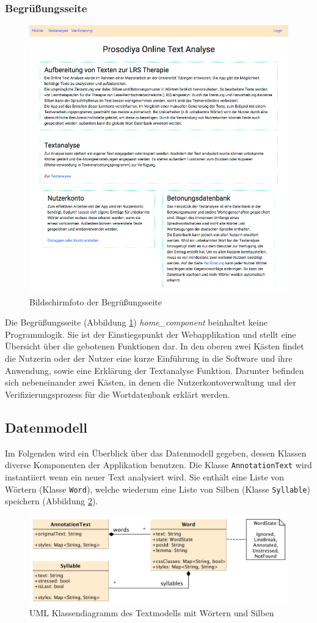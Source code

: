 \subsubsection{Begrüßungsseite}

\begin{figure}[h!]
	\centering
	\includegraphics[width=.6\linewidth, frame]{figures/frontend/home}
	\caption{Bildschirmfoto der Begrüßungsseite}
	\label{fig:frontend-home}
\end{figure}

Die Begrüßungsseite (Abbildung \ref{fig:frontend-home}) \textit{home\_component} beinhaltet keine Programmlogik. Sie ist der Einstiegspunkt der Webapplikation und stellt eine Übersicht über die gebotenen Funktionen dar. In den oberen zwei Kästen findet die Nutzerin oder der Nutzer eine kurze Einführung in die Software und ihre Anwendung, sowie eine Erklärung der Textanalyse Funktion. Darunter befinden sich nebeneinander zwei Kästen, in denen die Nutzerkontoverwaltung und der Verifizierungsprozess für die Wortdatenbank erklärt werden.

\subsection{Datenmodell}

Im Folgenden wird ein Überblick über das Datenmodell gegeben, dessen Klassen diverse Komponenten der Applikation benutzen. Die Klasse \texttt{AnnotationText} wird instantiiert wenn ein neuer Text analysiert wird. Sie
enthält eine Liste von Wörtern (Klasse \texttt{Word}), welche wiederum eine Liste von Silben (Klasse \texttt{Syllable}) speichern (Abbildung \ref{fig:frontendmodel}). \\

\begin{figure}[h!]
	\centering
	\includegraphics[width=.8\linewidth]{figures/frontend/uml-annotationtext}
	\caption{UML Klassendiagramm des Textmodells mit Wörtern und Silben}
	\label{fig:frontendmodel}
\end{figure}



